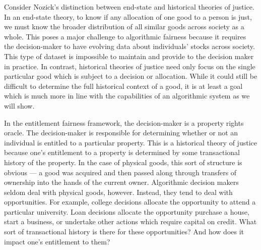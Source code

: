 Consider Nozick's distinction between end-state and historical theories of
justice. In an end-state theory, to know if any allocation of one good to a
person is just, we must know the broader distribution of all similar goods
across society as a whole. This poses a major challenge to algorithmic fairness
because it requires the decision-maker to have evolving data about individuals'
stocks across society. This type of dataset is impossible to maintain and
provide to the decision maker in practice. In contrast, historical theories of
justice need only focus on the single particular good which is subject to a
decision or allocation. While it could still be difficult to determine the full
historical context of a good, it is at least a goal which is much more in line
with the capabilities of an algorithmic system as we will show.

In the entitlement fairness framework, the decision-maker is a property rights
oracle. The decision-maker is responsible for determining whether or not an
individual is entitled to a particular property. This is a historical theory of
justice because one's entitlement to a property is determined by some
transactional history of the property. In the case of physical goods, this sort
of structure is obvious — a good was acquired and then passed along through
transfers of ownership into the hands of the current owner. Algorithmic decision
makers seldom deal with physical goods, however. Instead, they tend to deal with
opportunities. For example, college decisions allocate the opportunity to attend
a particular university. Loan decisions allocate the opportunity purchase a
house, start a business, or undertake other actions which require capital on
credit. What sort of transactional history is there for these opportunities? And
how does it impact one's entitlement to them?

